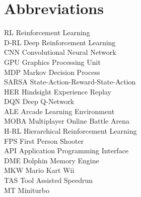 
\chapter*{Abbreviations}

\begin{flushleft}

RL \hfill Reinforcement Learning
\\D-RL \hfill Deep Reinforcement Learning
\\CNN \hfill  Convolutional Neural Network
\\GPU \hfill  Graphics Processing Unit
\\MDP \hfill  Markov Decision Process
\\SARSA \hfill  State-Action-Reward-State-Action
\\HER \hfill  Hindsight Experience Replay
\\DQN \hfill  Deep Q-Network
\\ALE \hfill  Arcade Learning Environment
\\MOBA \hfill  Multiplayer Online Battle Arena
\\H-RL \hfill  Hierarchical Reinforcement Learning
\\FPS \hfill  First Person Shooter
\\API \hfill  Application Programming Interface
\\DME \hfill  Dolphin Memory Engine
\\MKW \hfill  Mario Kart Wii
\\TAS \hfill  Tool Assisted Speedrun
\\MT \hfill  Miniturbo

\end{flushleft}